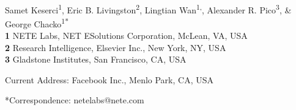 \documentclass[10pt,letterpaper]{article}
\date{}
\begin{document}
\vspace*{0.2in}

\begin{flushleft}
{\Large
\textbf{} %
}
\newline
\\
Samet Keserci\textsuperscript{1},
Eric B. Livingston\textsuperscript{2},
Lingtian Wan\textsuperscript{1,\textcurrency},
Alexander R. Pico\textsuperscript{3},
 \& George Chacko\textsuperscript{1*}
\\
\bigskip
\textbf{1} NETE Labs, NET ESolutions Corporation, McLean, VA, USA
\\
\textbf{2} Research Intelligence, Elsevier Inc., New York, NY, USA
\\
\textbf{3} Gladstone Institutes, San Francisco, CA, USA
\\
\bigskip


% 
%


\textcurrency Current Address: Facebook Inc., Menlo Park, CA, USA %



*Correspondence: netelabs@nete.com
\end{flushleft}
\end{document}
